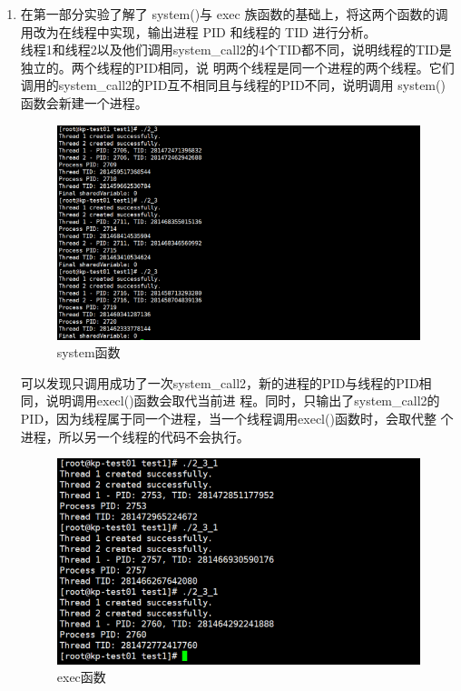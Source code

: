 \documentclass{article}
\begin{document}
\begin{enumerate}
        \item 在第一部分实验了解了 system()与 exec 族函数的基础上，将这两个函数的调用改为在线程中实现，输出进程 PID 和线程的 TID 进行分析。\\
        线程1和线程2以及他们调用system\_call2的4个TID都不同，说明线程的TID是独立的。两个线程的PID相同，说
        明两个线程是同一个进程的两个线程。它们调用的system\_call2的PID互不相同且与线程的PID不同，说明调用
        system()函数会新建一个进程。\\
        \begin{figure}[htbp]
            \centering
            \includegraphics[scale=0.6]{picture/10.png}
            \caption{system函数}
            \label{10}
        \end{figure}
        可以发现只调用成功了一次system\_call2，新的进程的PID与线程的PID相同，说明调用execl()函数会取代当前进
        程。同时，只输出了system\_call2的PID，因为线程属于同一个进程，当一个线程调用execl()函数时，会取代整
        个进程，所以另一个线程的代码不会执行。
        \begin{figure}[htbp]
            \centering
            \includegraphics[scale=0.6]{picture/11.png}
            \caption{exec函数}
            \label{11}
        \end{figure}
    \end{enumerate}
\end{document}
